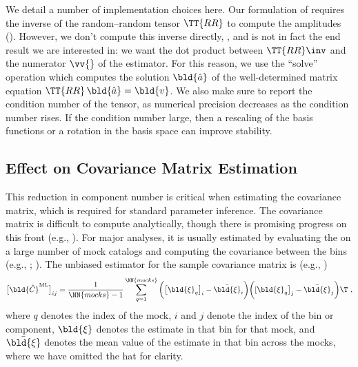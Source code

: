 We detail a number of implementation choices here.
Our formulation of \est requires the inverse of the random--random tensor $\TT{RR}$ to compute the amplitudes ().
However, we don't compute this inverse directly, , and is not in fact the end result we are interested in: we want the dot product between $\TT{RR}\inv$ and the numerator $\vv{}$ of the estimator.
For this reason, we use the ``solve'' operation which computes the solution $\bld{\hat a}$ of the well-determined matrix equation $\TT{RR}\,\bld{\hat a}=\bld{v}$.
We also make sure to report the condition number of the tensor, as numerical precision decreases as the condition number rises.
If the condition number large, then a rescaling of the basis functions or a rotation in the basis space can improve stability.

\subsection{Effect on Covariance Matrix Estimation}
\label{sec:covariance}

This reduction in component number is critical when estimating the covariance matrix, which is required for standard parameter inference.
The covariance matrix is difficult to compute analytically, though there is promising progress on this front (e.g., \citealt{Wadekar2020}).
For major analyses, it is usually estimated by evaluating the \cf on a large number of mock catalogs and computing the covariance between the bins (e.g., \citealt{Reid2010}; \citealt{Anderson2014}).
The unbiased estimator for the sample covariance matrix is (e.g., \citealt{Anderson2003})
\begin{equation}
\big[ \bld{\hat{C}}^\mathrm{ML} \big]_{ij} = \frac{1}{\NN{mocks}-1} \sum_{q=1}^{\NN{mocks}} \bigg( \big[\bld{\xi}_q \big]_i - \bar{\bld{\xi}}_i \bigg) \bigg([\bld{\xi}_q \big]_j - \bar{\bld{\xi}}_j \bigg)\T ~,
\end{equation}
where $q$ denotes the index of the mock, $i$ and $j$ denote the index of the bin or component, $\bld{\xi}$ denotes the estimate in that bin for that mock, and $\bar{\bld{\xi}}$ denotes the mean value of the estimate in that bin across the mocks, where we have omitted the hat for clarity.

